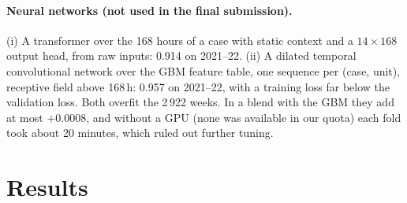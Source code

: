 \documentclass[11pt,a4paper]{article}
\begin{document}
\paragraph{Neural networks (not used in the final submission).} (i) A transformer over the 168 hours of a case
with static context and a $14\times168$ output head, from raw inputs: 0.914 on 2021--22.
(ii) A dilated temporal convolutional network over the GBM feature table, one sequence per (case, unit),
receptive field above 168\,h: 0.957 on 2021--22, with a training loss far below the validation loss. Both
overfit the 2\,922 weeks. In a blend with the GBM they add at most $+0.0008$, and without a GPU (none was
available in our quota) each fold took about 20 minutes, which ruled out further tuning.

\section{Results}\label{sec:results}
\end{document}
